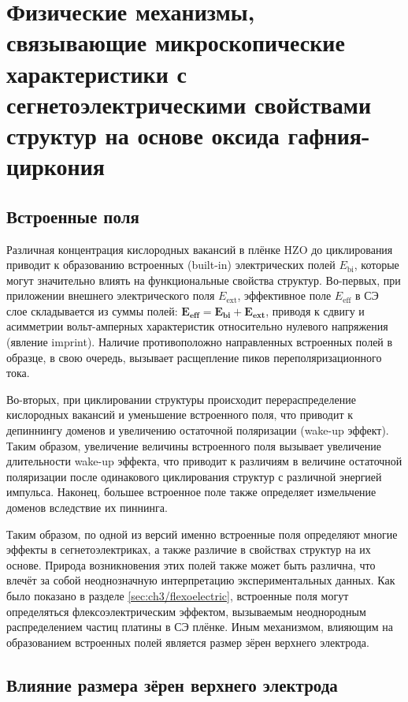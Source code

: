 \chapter{Физические механизмы, связывающие микроскопические характеристики с сегнетоэлектрическими свойствами структур на основе оксида гафния-циркония}

\section{Встроенные поля}

Различная концентрация кислородных вакансий в плёнке HZO до циклирования приводит к образованию встроенных (built-in) электрических полей \(E_\text{bi}\), которые могут значительно влиять на функциональные свойства структур. Во-первых, при приложении внешнего электрического поля \(E_\text{ext}\), эффективное поле \(E_\text{eff}\) в СЭ слое складывается из суммы полей: \(\boldsymbol{E_\text{eff}} = \boldsymbol{E_\text{bi}} + \boldsymbol{E_\text{ext}}\), приводя к сдвигу и асимметрии вольт-амперных характеристик относительно нулевого напряжения (явление imprint). Наличие противоположно направленных встроенных полей в образце, в свою очередь, вызывает расщепление пиков переполяризационного тока.

Во-вторых, при циклировании структуры происходит перераспределение кислородных вакансий и уменьшение встроенного поля, что приводит к депиннингу доменов и увеличению остаточной поляризации (wake-up эффект). Таким образом, увеличение величины встроенного поля вызывает увеличение длительности wake-up эффекта, что приводит к различиям в величине остаточной поляризации после одинакового циклирования структур с различной энергией импульса. Наконец, большее встроенное поле также определяет измельчение доменов вследствие их пиннинга.

Таким образом, по одной из версий именно встроенные поля определяют многие эффекты в сегнетоэлектриках, а также различие в свойствах структур на их основе. Природа возникновения этих полей также может быть различна, что влечёт за собой неоднозначную интерпретацию экспериментальных данных. Как было показано в разделе \cref{sec:ch3/flexoelectric}, встроенные поля могут определяться флексоэлектрическим эффектом, вызываемым неоднородным распределением частиц платины в СЭ плёнке. Иным механизмом, влияющим на образованием встроенных полей является размер зёрен верхнего электрода.

\section{Влияние размера зёрен верхнего электрода}

